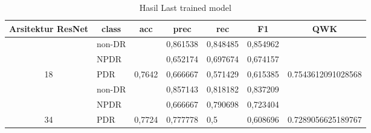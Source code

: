     \begin{table}[hbtp]
        \begin{center}
        \caption{Hasil Last trained model}
        \label{tb:HasilLastDefault}
        \begin{tabular}{|c|l|c|l|l|l|c|}
            \hline
            \rowcolor[HTML]{C0C0C0} 
            Arsitektur ResNet   & \multicolumn{1}{c|}{\cellcolor[HTML]{C0C0C0}class} & acc                      & \multicolumn{1}{c|}{\cellcolor[HTML]{C0C0C0}prec} & \multicolumn{1}{c|}{\cellcolor[HTML]{C0C0C0}rec} & \multicolumn{1}{c|}{\cellcolor[HTML]{C0C0C0}F1} & QWK                                  \\ \hline
                                  & non-DR                                             &                          & 0,861538                                          & 0,848485                                         & 0,854962                                        &                                      \\ \cline{2-2} \cline{4-6}
                                  & NPDR                                               &                          & 0,652174                                          & 0,697674                                         & 0,674157                                        &                                      \\ \cline{2-2} \cline{4-6}
            \multirow{-3}{*}{18}  & PDR                                                & \multirow{-3}{*}{0,7642} & 0,666667                                          & 0,571429                                         & 0,615385                                        & \multirow{-3}{*}{0.7543612091028568} \\ \hline
                                  & non-DR                                             &                          & 0,857143                                          & 0,818182                                         & 0,837209                                        &                                      \\ \cline{2-2} \cline{4-6}
                                  & NPDR                                               &                          & 0,666667                                          & 0,790698                                         & 0,723404                                        &                                      \\ \cline{2-2} \cline{4-6}
            \multirow{-3}{*}{34}  & PDR                                                & \multirow{-3}{*}{0,7724} & 0,777778                                          & 0,5                                              & 0,608696                                        & \multirow{-3}{*}{0.7289056625189767} \\ \hline

\end{tabular}
\end{center}
\end{table}
